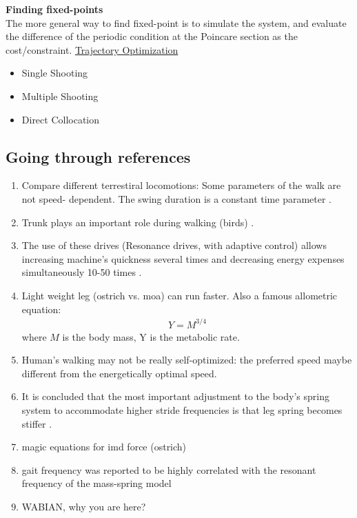 \documentclass{article}
\begin{document}
\noindent \textbf{Finding fixed-points}\\
The more general way to find fixed-point is to simulate the system, and evaluate the difference of the periodic condition at the Poincare section as the cost/constraint. \underline{Trajectory Optimization}%
\begin{itemize}
\item Single Shooting
\item Multiple Shooting
\item Direct Collocation
\end{itemize}


\subsection{Going through references}
\begin{enumerate}
\item Compare different terrestiral locomotions: Some parameters of the walk are not speed- dependent. The swing duration is a constant time parameter \cite{Abourachid2001}.
\item Trunk plays an important role during walking (birds) \cite{Abourachid2011}.
\item The use of these drives (Resonance drives, with adaptive control) allows increasing machine's quickness several times and decreasing energy expenses simultaneously 10-50 times \cite{Akinfiev1999}.
\item Light weight leg (ostrich vs. moa) can run faster\cite{Alexander1985}. Also a famous allometric equation:
\begin{align}
Y = M^{3/4}
\end{align}
where $M$ is the body mass, Y is the metabolic rate.
\item Human's walking may not be really self-optimized: the preferred speed maybe different from the energetically optimal speed\cite{Arnall2012}.
\item It is concluded that the most important adjustment to the body’s spring system to accommodate higher stride frequencies is that leg spring becomes stiffer \cite{Farley1996}.
\item magic equations for imd force (ostrich) \cite{Jindrich2007}
\item gait frequency was reported to be highly correlated with the resonant frequency of the mass-spring model \cite{Lee2013}
\item WABIAN, why you are here? \cite{Lim2008}
\end{enumerate}
\end{document}
